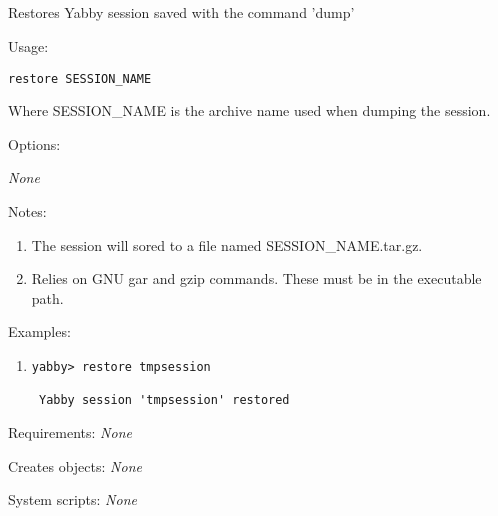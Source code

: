 

\subsection[restore]{  }



Restores Yabby session saved with the command 'dump'


\begin{description}


\item{Usage:}

{\tt restore SESSION\_NAME}

Where SESSION\_NAME is the archive name used when dumping
the session.


\item{Options:}
\begin{description}
{\em None}
\end{description}


\item{Notes:}
\begin{enumerate}
\item The session will sored to a file named SESSION\_NAME.tar.gz.
\item Relies on GNU gar and gzip commands. These must be in the
 executable path.
\end{enumerate}


\item{Examples:}
\begin{enumerate}

\item
\begin{verbatim}
yabby> restore tmpsession

 Yabby session 'tmpsession' restored
\end{verbatim}

\end{enumerate}


\item{Requirements:} {\em None}


\item{Creates objects:} {\em None}


\item{System scripts:} {\em None}

\end{description}


